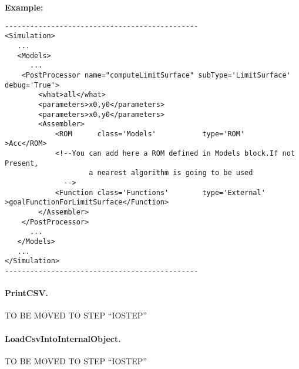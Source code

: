 \textbf{Example:}
\begin{lstlisting}[style=XML]
----------------------------------------------
<Simulation>
   ...
   <Models>
      ...
    <PostProcessor name="computeLimitSurface" subType='LimitSurface' debug='True'>
        <what>all</what>
        <parameters>x0,y0</parameters>
        <parameters>x0,y0</parameters>
        <Assembler>
            <ROM      class='Models'           type='ROM'             >Acc</ROM> 
            <!--You can add here a ROM defined in Models block.If not Present, 
                    a nearest algorithm is going to be used
              -->
            <Function class='Functions'        type='External'        >goalFunctionForLimitSurface</Function>
        </Assembler>
    </PostProcessor>
      ...
   </Models>
   ...
</Simulation>
----------------------------------------------
\end{lstlisting}
\paragraph{PrintCSV.}
\label{PrintCSV}
TO BE MOVED TO STEP ``IOSTEP''
\paragraph{LoadCsvIntoInternalObject.}
\label{LoadCsvIntoInternalObject}
TO BE MOVED TO STEP ``IOSTEP''